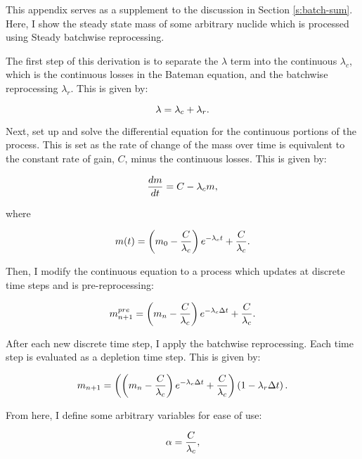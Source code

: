 This appendix serves as a supplement to the discussion in Section \ref{s:batch-sum}.
Here, I show the steady state mass of some arbitrary nuclide which is processed using Steady batchwise reprocessing.

The first step of this derivation is to separate the $\lambda$ term into the continuous $\lambda_c$, which is the continuous losses in the Bateman equation, and the batchwise reprocessing $\lambda_r$.
This is given by:

\begin{equation} \hfill
\lambda = \lambda_c + \lambda_r.
\hfill \end{equation}

Next, set up and solve the differential equation for the continuous portions of the process.
This is set as the rate of change of the mass over time is equivalent to the constant rate of gain, $C$, minus the continuous losses.
This is given by:

\begin{equation} \hfill
\frac{dm}{dt} = C - \lambda_c m,
\hfill \end{equation}

where

\begin{equation} \hfill
m(t) = \left(m_0 - \frac{C}{\lambda_c} \right) e^{-\lambda_c t}  + \frac{C}{\lambda_c}.
\hfill \end{equation}

Then, I modify the continuous equation to a process which updates at discrete time steps and is pre-reprocessing:

\begin{equation} \hfill
m_{n+1}^{pre} = \left(m_n - \frac{C}{\lambda_c} \right) e^{-\lambda_c \Delta t}  + \frac{C}{\lambda_c}.
\hfill \end{equation}

After each new discrete time step, I apply the batchwise reprocessing. 
Each time step is evaluated as a depletion time step.
This is given by:

\begin{equation} \hfill
m_{n+1} = \left(\left(m_n - \frac{C}{\lambda_c} \right) e^{-\lambda_c \Delta t}  + \frac{C}{\lambda_c}\right) \left(1 - {\lambda_r \Delta t} \right).
\hfill \label{eq:nplusone}\end{equation}

From here, I define some arbitrary variables for ease of use:

\begin{equation} \hfill
\alpha = \frac{C}{\lambda_c},
\hfill \end{equation}

